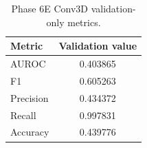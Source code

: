 \begin{table}[t]
\centering
\caption{Phase 6E Conv3D validation-only metrics.}
\begin{tabular}{lc}
\hline
Metric & Validation value \\
\hline
AUROC & 0.403865 \\
F1 & 0.605263 \\
Precision & 0.434372 \\
Recall & 0.997831 \\
Accuracy & 0.439776 \\
\hline
\end{tabular}
\label{tab:phase6e-validation}
\end{table}
